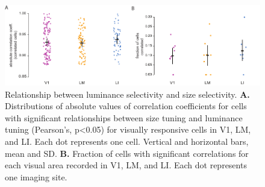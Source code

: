 \begin{figure}[hbt!]
\includegraphics[width=\textwidth]{figures/supplemental/fig_s13_luminance_corr/fig_s13_luminance_corr.pdf}
    \centering
    \caption[Luminance and size tuning]{Relationship between luminance selectivity and size selectivity.
    \textbf{A.} Distributions of absolute values of correlation coefficients for cells with significant relationships between size tuning and luminance tuning (Pearson's, p<0.05) for visually responsive cells in V1, LM, and LI. Each dot represents one cell. Vertical and horizontal bars, mean and SD. 
    \textbf{B.} Fraction of cells with significant correlations for each visual area recorded in V1, LM, and LI. Each dot represents one imaging site.  
    \label{supfig:luminance_corr}}
\end{figure}





